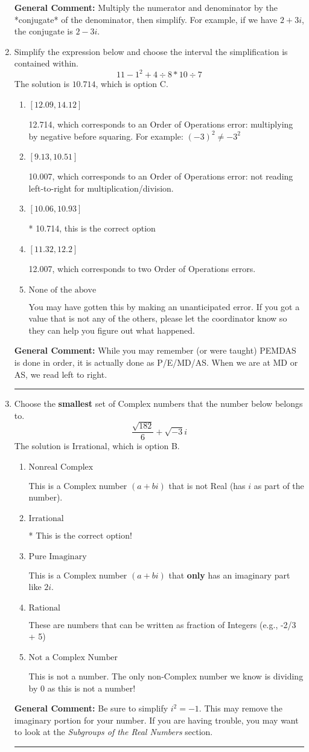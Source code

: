 \documentclass{extbook}[14pt]
\newcommand{\litem}[1]{\item #1

\rule{\textwidth}{0.4pt}}
\begin{document}
\begin{enumerate}
{\textbf{General Comment:} Multiply the numerator and denominator by the *conjugate* of the denominator, then simplify. For example, if we have $2+3i$, the conjugate is $2-3i$.
}
\litem{
Simplify the expression below and choose the interval the simplification is contained within.
\[ 11 - 1^2 + 4 \div 8 * 10 \div 7 \]
The solution is \( 10.714 \), which is option C.\begin{enumerate}[label=\Alph*.]
\item \( [12.09, 14.12] \)

 12.714, which corresponds to an Order of Operations error: multiplying by negative before squaring. For example: $(-3)^2 \neq -3^2$
\item \( [9.13, 10.51] \)

 10.007, which corresponds to an Order of Operations error: not reading left-to-right for multiplication/division.
\item \( [10.06, 10.93] \)

* 10.714, this is the correct option
\item \( [11.32, 12.2] \)

 12.007, which corresponds to two Order of Operations errors.
\item \( \text{None of the above} \)

 You may have gotten this by making an unanticipated error. If you got a value that is not any of the others, please let the coordinator know so they can help you figure out what happened.
\end{enumerate}

\textbf{General Comment:} While you may remember (or were taught) PEMDAS is done in order, it is actually done as P/E/MD/AS. When we are at MD or AS, we read left to right.
}
\litem{
Choose the \textbf{smallest} set of Complex numbers that the number below belongs to.
\[ \frac{\sqrt{182}}{6}+\sqrt{-3}i \]
The solution is \( \text{Irrational} \), which is option B.\begin{enumerate}[label=\Alph*.]
\item \( \text{Nonreal Complex} \)

This is a Complex number $(a+bi)$ that is not Real (has $i$ as part of the number).
\item \( \text{Irrational} \)

* This is the correct option!
\item \( \text{Pure Imaginary} \)

This is a Complex number $(a+bi)$ that \textbf{only} has an imaginary part like $2i$.
\item \( \text{Rational} \)

These are numbers that can be written as fraction of Integers (e.g., -2/3 + 5)
\item \( \text{Not a Complex Number} \)

This is not a number. The only non-Complex number we know is dividing by 0 as this is not a number!
\end{enumerate}

\textbf{General Comment:} Be sure to simplify $i^2 = -1$. This may remove the imaginary portion for your number. If you are having trouble, you may want to look at the \textit{Subgroups of the Real Numbers} section.
}
\end{enumerate}
\end{document}
